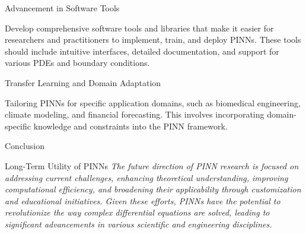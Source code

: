 \begin{frame}
 
    \begin{block}{Advancement in Software Tools}
    
        Develop comprehensive software tools and libraries that make it easier for researchers and practitioners to implement, train, and deploy PINNs. These tools should include intuitive interfaces, detailed documentation, and support for various PDEs and boundary conditions.

    \end{block}

    \begin{block}{Transfer Learning and Domain Adaptation}
    
        Tailoring PINNs for specific application domains, such as biomedical engineering, climate modeling, and financial forecasting. This involves incorporating domain-specific knowledge and constraints into the PINN framework.

    \end{block}
\end{frame}
\begin{frame}{Conclusion}
\begin{block}{Long-Term Utility of PINNs}
        \emph{The future direction of PINN research is focused on addressing current challenges, enhancing theoretical understanding, improving computational efficiency, and broadening their applicability through customization and educational initiatives. Given these efforts, PINNs have the potential to revolutionize the way complex differential equations are solved, leading to significant advancements in various scientific and engineering disciplines.}
    \end{block}
\end{frame}